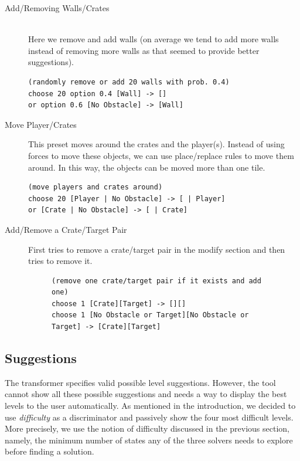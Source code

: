 \begin{description}
    \item[Add/Removing Walls/Crates] \hfill \\
    Here we remove and add walls (on average we tend to add more walls instead of removing more walls as that seemed to provide better suggestions).
    \hfill \\
        
    \begin{lstlisting}
(randomly remove or add 20 walls with prob. 0.4)
choose 20 option 0.4 [Wall] -> []
or option 0.6 [No Obstacle] -> [Wall]
    \end{lstlisting}
        
    \item[Move Player/Crates] This preset moves around the crates and the player(s). Instead of using forces to move these objects, we can use place/replace rules to move them around. In this way, the objects can be moved more than one tile.
    
       \begin{lstlisting}
(move players and crates around)
choose 20 [Player | No Obstacle] -> [ | Player]
or [Crate | No Obstacle] -> [ | Crate]  
    \end{lstlisting}         
    
    \item[Add/Remove a Crate/Target Pair]
    First tries to remove a crate/target pair in the modify section and then tries to remove it.

    \begin{figure}[!htbp]
    \centering
    \footnotesize
    \begin{lstlisting}
(remove one crate/target pair if it exists and add one)
choose 1 [Crate][Target] -> [][]
choose 1 [No Obstacle or Target][No Obstacle or Target] -> [Crate][Target]    
    \end{lstlisting}
    \end{figure}

\end{description}

\subsection{Suggestions} %

The transformer specifies valid possible level suggestions. However, the tool cannot show all these possible suggestions and needs a way to display the best levels to the user automatically.
As mentioned in the introduction, we decided to use \textit{difficulty} as a discriminator and passively show the four most difficult levels. More precisely, we use the notion of difficulty discussed in the previous section, namely, the minimum number of states any of the three solvers needs to explore before finding a solution.

